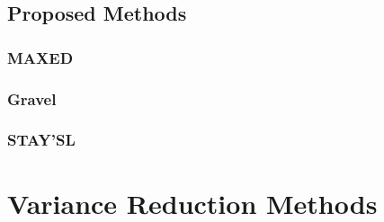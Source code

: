 \subsection{Proposed Methods}



\subsubsection{MAXED}





\subsubsection{Gravel}


\subsubsection{STAY'SL}




\section{Variance Reduction Methods}

